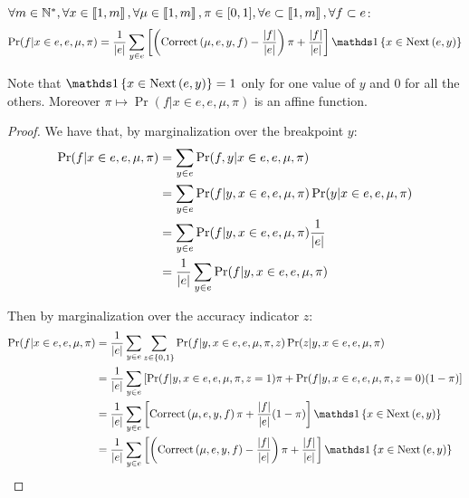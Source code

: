 \begin{lemma}
    \label{lemma:bos_transition}
    $\forall m \in \mathbb{N}^*, \forall x \in \left\llbracket1, m\right\rrbracket, \forall \mu \in \left\llbracket1, m\right\rrbracket, \pi \in [0, 1], \forall e \subset \left\llbracket1, m\right\rrbracket, \forall f \subset e$:
    \[ \Pr(f | x \in e, e, \mu, \pi) =  \frac{1}{\card{e}}  \sum_{y \in e} \left[ \left( \correct{\mu}{e}{y}{f} - \frac{\card{f}}{\card{e}} \right) \pi + \frac{\card{f}}{\card{e}} \right]  \indickronecker{x \in \nextes{e}{y}} \]

    Note that $\indickronecker{x \in \nextes{e}{y}} = 1$ only for one value of $y$ and $0$ for all the others. Moreover $\pi \mapsto \Pr(f | x \in e, e, \mu, \pi)$ is an affine function.
\end{lemma}
\begin{proof}
    We have that, by marginalization over the breakpoint $y$:
    \begin{align}
        \Pr(f | x \in e, e, \mu, \pi) 
        &= \sum_{y \in e} \Pr(f, y | x \in e, e, \mu, \pi) \\
        &= \sum_{y \in e} \Pr(f | y, x \in e, e, \mu, \pi) \Pr(y | x \in e, e, \mu, \pi) \\
        &= \sum_{y \in e} \Pr(f | y, x \in e, e, \mu, \pi) \frac{1}{\left|e\right|} \\
        &= \frac{1}{\left|e\right|} \sum_{y \in e} \Pr(f | y, x \in e, e, \mu, \pi)
    \end{align}

    Then by marginalization over the accuracy indicator $z$:
    \begin{align}
        \Pr(f | x \in e, e, \mu, \pi) 
        &= \frac{1}{\card{e}} \sum_{y \in e} \sum_{z \in \set{0, 1}} \Pr(f | y, x \in e, e, \mu, \pi, z) \Pr(z | y, x \in e, e, \mu, \pi) \\
        &= \frac{1}{\card{e}} \sum_{y \in e} \left[ \Pr(f | y, x \in e, e, \mu, \pi, z=1) \pi + \Pr(f | y, x \in e, e, \mu, \pi, z=0) (1 - \pi) \right] \\
        &= \frac{1}{\card{e}}  \sum_{y \in e} \left[ \correct{\mu}{e}{y}{f} \pi + \frac{\card{f}}{\card{e}} (1 - \pi) \right]  \indickronecker{x \in \nextes{e}{y}} \\
        &= \frac{1}{\card{e}}  \sum_{y \in e} \left[ \left( \correct{\mu}{e}{y}{f} - \frac{\card{f}}{\card{e}} \right) \pi + \frac{\card{f}}{\card{e}} \right]  \indickronecker{x \in \nextes{e}{y}}
    \end{align}
\end{proof}

